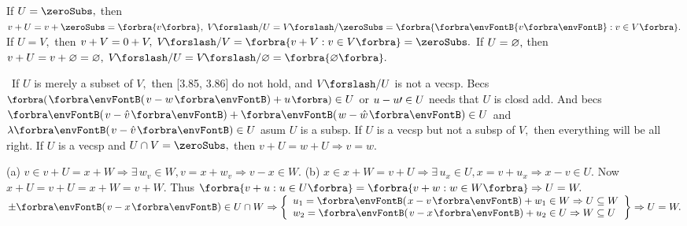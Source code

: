 \BulletPointX\NoteForSmall{[3.79, 3.83]}\;\;If $U=\zeroSubs,$ then $v+U=v+\zeroSubs=\Bra{v},\;V\XSlash U=V\XSlash\zeroSubs=\Bra{\Bra[\envFontB]{v}:v\in V}.$\TextB{}
\Blind{\NoteForSmall{[3.79, 3.83]}\;\;}If $U=V,$ then $v+V=0+V,\;V\XSlash V=\Bra{v+V:v\in V}=\zeroSubs.$\TextB{}
\Blind{\NoteForSmall{[3.79, 3.83]}\;\;}If $U=\varnothing,$ then $v+U=v+\emptySet=\emptySet,\;V\XSlash U=V\XSlash\emptySet=\Bra{\emptySet}.$\vspace{-2pt}
\SepLine

\BulletPointX\Comment \,\,\,If $U$ is merely a subset of $V,$ then [3.85, 3.86] do not hold, and $V\XSlash U$ is not a vecsp.\parCom{\IndentB}
Becs $\BigPar{\Par{v-w}+u}\in U$ or $u-u\prime\in U$ needs that $U$ is closd add.\parCom{\IndentB}
And becs $\Par{v-\hat{v}}+\Par{w-\hat{w}}\in U$ and $\lambda\Par{v-\hat{v}}\in U$ asum $U$ is a subsp.\vspace{4pt}\parCom{\IndentB}
If $U$ is a vecsp but not a subsp of $V,$ then everything will be all right.\parCom{\IndentB}
If $U$ is a vecsp and $U\cap V=\zeroSubs,$ then $v+U=w+U\Rightarrow v=w.$
\SepLine

\BulletPointX\NoteForSmall{[3.85]}\;\;
\vspace{-4pt}
\SepLine


\SepLine


(a) $v\in v+U=x+W\Rightarrow\exists\,w_v\in W,v=x+w_v\Rightarrow v-x\in W.$\parSol{}
(b) $x\in x+W=v+U\Rightarrow\exists\,u_x\in U,x=v+u_x\Rightarrow x-v\in U.$\parSol{\vspace{2pt}}
Now $x+U=v+U=x+W=v+W.$ Thus $\Bra{v+u:u\in U}=\Bra{v+w:w\in W}\Rightarrow U=W.$\parSol{\vspace{4pt}}
\Or $\pm\Par{v-x}\in U\cap W \Rightarrow\MathLeftrightBrace{l}{u_1=\Par{x-v}+w_1\in W\Rightarrow U\subseteq W\\w_2=\Par{v-x}+u_2\in U\Rightarrow W\subseteq U}\Rightarrow U=W.$\PfEnd[-14pt]
\SepLine

